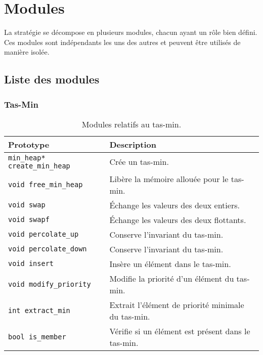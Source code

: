 \chapter{Modules}
\label{chap:modules}

La stratégie se décompose en plusieurs modules, chacun ayant un rôle bien défini.
Ces modules sont indépendants les uns des autres et peuvent être utilisés de manière isolée.

\section{Liste des modules}

\subsection{Tas-Min}

\begin{table}[!htpb]
    \label{tab:modules-min_heap}
    \begin{tabularx}{\textwidth}{lX}
        \toprule
        \textbf{Prototype} & \textbf{Description} \\
        \midrule
        \texttt{min\_heap* create\_min\_heap} & Crée un tas-min. \\
        \texttt{void free\_min\_heap} & Libère la mémoire allouée pour le tas-min. \\
        \texttt{void swap} & Échange les valeurs des deux entiers. \\
        \texttt{void swapf} & Échange les valeurs des deux flottants. \\
        \texttt{void percolate\_up} & Conserve l'invariant du tas-min. \\
        \texttt{void percolate\_down} & Conserve l'invariant du tas-min. \\
        \texttt{void insert} & Insère un élément dans le tas-min. \\
        \texttt{void modify\_priority} & Modifie la priorité d'un élément du tas-min. \\
        \texttt{int extract\_min} & Extrait l'élément de priorité minimale du tas-min. \\
        \texttt{bool is\_member} & Vérifie si un élément est présent dans le tas-min. \\
        \bottomrule
    \end{tabularx}
    \caption{Modules relatifs au tas-min.}
\end{table}

